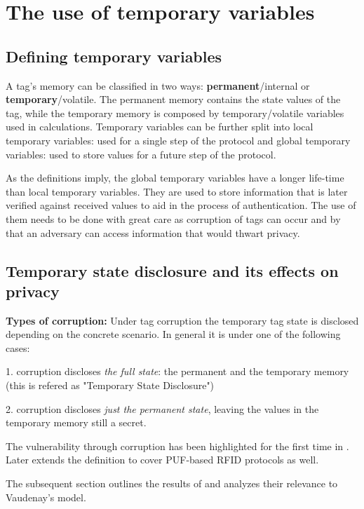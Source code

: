 \chapter{The use of temporary variables}

\section{Defining temporary variables}

    A tag's memory can be classified in two ways: \textbf{permanent}/internal or \textbf{temporary}/volatile. The permanent memory contains the state values of the tag, while the temporary memory is
    composed by temporary/volatile variables used in calculations. Temporary variables can be further split into local temporary variables: used for a single step of the protocol
    and global temporary variables: used to store values for a future step of the protocol.

    As the definitions imply, the global temporary variables have a longer life-time than local temporary variables. They are used to
    store information that is later 
    verified against received values to aid in the process of authentication. The use of them needs to be done with great care as corruption of 
    tags can occur and by that an adversary can access information that would thwart privacy.

\section{Temporary state disclosure and its effects on privacy}

    \textbf{Types of corruption:}
    Under tag corruption the temporary tag state is disclosed depending on the concrete scenario. In general it is
    under one of the following cases:

    1. corruption discloses \textit{the full state}: the permanent and the temporary memory (this is refered as "Temporary State Disclosure")

    2. corruption discloses \textit{just the permanent state}, leaving the values in the temporary memory still a secret.

    The vulnerability through corruption has been highlighted for the first time in \cite{Impossibility_results}. Later \cite{Tiplea} 
    extends the definition to cover PUF-based RFID protocols as well. 

    The subsequent section outlines the results of \cite{Impossibility_results} and analyzes their relevance to Vaudenay's model.

